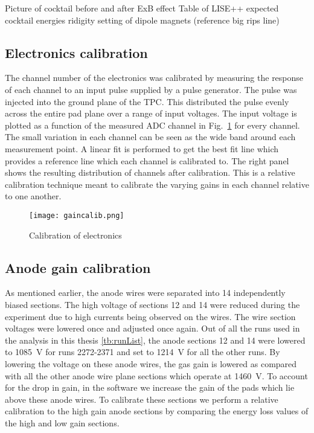 Picture of cocktail before and after ExB effect
Table of LISE++ expected cocktail energies ridigity setting of dipole magnets (reference big rips line)



\subsection{Electronics calibration}
The channel number of the electronics was calibrated by measuring the response of each channel to an input pulse supplied by a pulse generator. The pulse was injected into the ground plane of the TPC. This distributed the pulse evenly across the entire pad plane over a range of input voltages. The input voltage is plotted as a function of the measured ADC channel in Fig.~\ref{fig:gaincalib} for every channel. The small variation in each channel can be seen as the wide band around each measurement point. A linear fit is performed to get the best fit line which provides a reference line which each channel is calibrated to. The right panel shows the resulting distribution of channels after calibration. This is a relative calibration technique meant to calibrate the varying gains in each channel relative to one another. 

\begin{figure}[H]
\texttt{[image: gaincalib.png]}
\caption{Calibration of electronics}
\label{fig:gaincalib}
\end{figure}

\subsection{Anode gain calibration}

As mentioned earlier, the anode wires were separated into 14 independently biased sections. The high voltage of sections 12 and 14 were reduced during the experiment due to high currents being observed on the wires. The wire section voltages were lowered once and adjusted once again. Out of all the runs used in the analysis in this thesis \ref{tb:runList}, the anode sections 12 and 14 were lowered to \SI{1085}{\volt} for runs 2272-2371 and set to \SI{1214}{\volt} for all the other runs. By lowering the voltage on these anode wires, the gas gain is lowered as compared with all the other anode wire plane sections which operate at \SI{1460}{\volt}. To account for the drop in gain, in the software we increase the gain of the pads which lie above these anode wires. To calibrate these sections we perform a relative calibration to the high gain anode sections by comparing the energy loss values of the high and low gain sections. 


